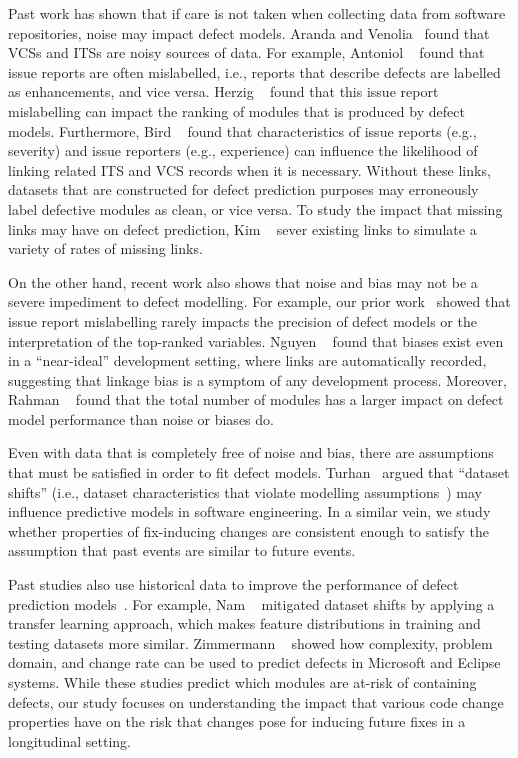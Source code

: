 Past work has shown that if care is not taken when collecting data from software repositories, noise may impact defect models.
Aranda and Venolia~\cite{aranda2009icse} found that VCSs and ITSs are noisy sources of data.
For example, Antoniol \ea~\cite{antoniol2008cascon} found that issue reports are often mislabelled, i.e., reports that describe defects are labelled as enhancements, and vice versa.
Herzig \ea~\cite{herzig2013icse} found that this issue report mislabelling can impact the ranking of modules that is produced by defect models.
Furthermore, Bird \ea~\cite{bird2009fse} found that characteristics of issue reports (e.g., severity) and issue reporters (e.g., experience) can influence the likelihood of linking related ITS and VCS records when it is necessary.
Without these links, datasets that are constructed for defect prediction purposes may erroneously label defective modules as clean, or vice versa.
To study the impact that missing links may have on defect prediction, Kim \ea~\cite{kim2011icse} sever existing links to simulate a variety of rates of missing links.

On the other hand, recent work also shows that noise and bias may not be a severe impediment to defect modelling.
For example, our prior work~\cite{tantithamthavorn2015icse} showed that issue report mislabelling rarely impacts the precision of defect models or the interpretation of the top-ranked variables.
Nguyen \ea~\cite{nguyen2010wcre} found that biases exist even in a ``near-ideal'' development setting, where links are automatically recorded, suggesting that linkage bias is a symptom of any development process.
Moreover, Rahman \ea~\cite{rahman2013fse} found that the total number of modules has a larger impact on defect model performance than noise or biases do.

Even with data that is completely free of noise and bias, there are assumptions that must be satisfied in order to fit defect models.
Turhan~\cite{turhan2012emse} argued that ``dataset shifts'' (i.e., dataset characteristics that violate modelling assumptions~\cite{menzies2013tse}) may influence predictive models in software engineering.
In a similar vein, we study whether properties of fix-inducing changes are consistent enough to satisfy the assumption that past events are similar to future events.

Past studies also use historical data to improve the performance of defect prediction models~\cite{kim2007icse, nam2013icse,zimmermann2008evolution}.
For example, Nam \ea~\cite{nam2013icse} mitigated dataset shifts by applying a transfer learning approach, which makes feature distributions in training and testing datasets more similar.
Zimmermann \ea~\cite{zimmermann2008evolution} showed how complexity, problem domain, and change rate can be used to predict defects in Microsoft and Eclipse systems.
While these studies predict which modules are at-risk of containing defects, our study focuses on understanding the impact that various code change properties have on the risk that changes pose for inducing future fixes in a longitudinal setting.

